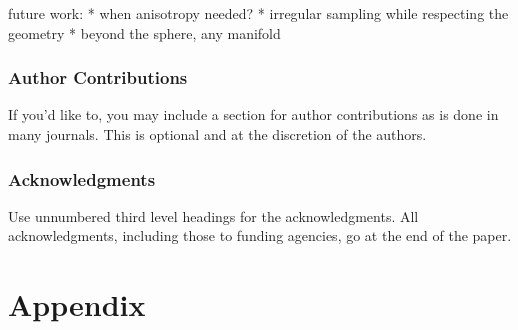 \documentclass{article} %
\begin{document}
future work:
* when anisotropy needed?
* irregular sampling while respecting the geometry
* beyond the sphere, any manifold


\newpage

\subsubsection*{Author Contributions}
If you'd like to, you may include  a section for author contributions as is done
in many journals. This is optional and at the discretion of the authors.

\subsubsection*{Acknowledgments}
Use unnumbered third level headings for the acknowledgments. All
acknowledgments, including those to funding agencies, go at the end of the paper.





\newpage

\appendix
\section{Appendix}

\subsection{}
\end{document}
